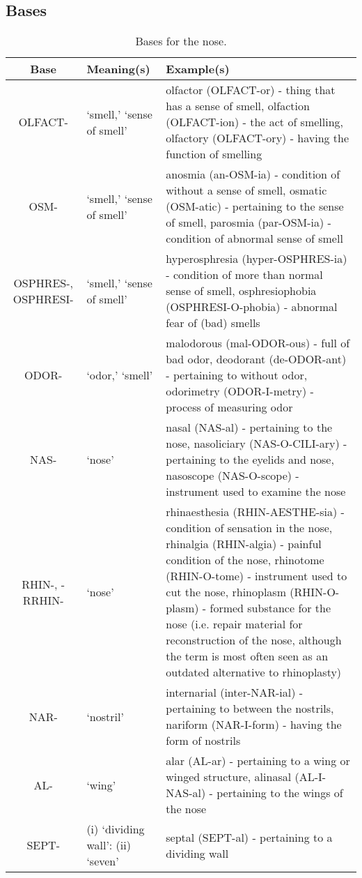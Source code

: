 \subsection{Bases}


\begin{longtable}{c | p{} | p{}}
    \caption{Bases for the nose.}
    \hline
    Base & Meaning(s) & Example(s) \\ \hline
        OLFACT- & `smell,' `sense of smell' & olfactor (OLFACT-or) - thing that has a sense of smell, olfaction (OLFACT-ion) - the act of smelling, olfactory (OLFACT-ory) - having the function of smelling \\
        OSM- & `smell,' `sense of smell' & anosmia (an-OSM-ia) - condition of without a sense of smell, osmatic (OSM-atic) - pertaining to the sense of smell, parosmia (par-OSM-ia) - condition of abnormal sense of smell \\
        OSPHRES-, OSPHRESI- & `smell,' `sense of smell' & hyperosphresia (hyper-OSPHRES-ia) - condition of more than normal sense of smell, osphresiophobia (OSPHRESI-O-phobia) - abnormal fear of (bad) smells \\
        ODOR- & `odor,' `smell' & malodorous (mal-ODOR-ous) - full of bad odor, deodorant (de-ODOR-ant) - pertaining to without odor, odorimetry (ODOR-I-metry) - process of measuring odor \\
        NAS- & `nose' & nasal (NAS-al) - pertaining to the nose, nasoliciary (NAS-O-CILI-ary) - pertaining to the eyelids and nose, nasoscope (NAS-O-scope) - instrument used to examine the nose \\
        RHIN-, -RRHIN- & `nose' & rhinaesthesia (RHIN-AESTHE-sia) - condition of sensation in the nose, rhinalgia (RHIN-algia) - painful condition of the nose, rhinotome (RHIN-O-tome) - instrument used to cut the nose, rhinoplasm (RHIN-O-plasm) - formed substance for the nose (i.e. repair material for reconstruction of the nose, although the term is most often seen as an outdated alternative to rhinoplasty) \\
        NAR- & `nostril' & internarial (inter-NAR-ial) - pertaining to between the nostrils, nariform (NAR-I-form) - having the form of nostrils \\
        AL- & `wing' & alar (AL-ar) - pertaining to a wing or winged structure, alinasal (AL-I-NAS-al) - pertaining to the wings of the nose \\
        SEPT- & (i) `dividing wall': (ii) `seven' & septal (SEPT-al) - pertaining to a dividing wall \\

\end{longtable}
